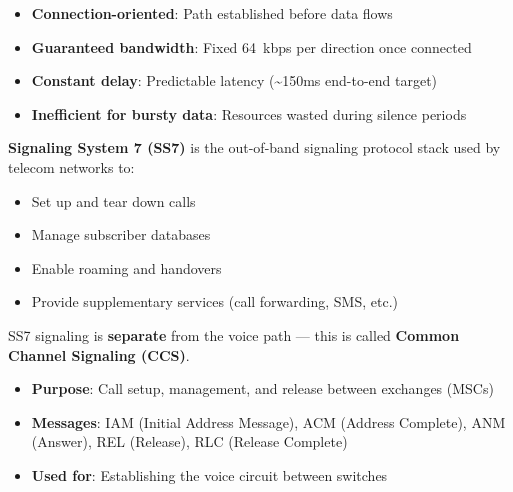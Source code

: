 
\begin{itemize}
\tightlist
\item
  \textbf{Connection-oriented}: Path established before data flows
\item
  \textbf{Guaranteed bandwidth}: Fixed 64~kbps per direction once connected
\item
  \textbf{Constant delay}: Predictable latency (\textasciitilde{}150ms end-to-end target)
\item
  \textbf{Inefficient for bursty data}: Resources wasted during silence periods
\end{itemize}



\CNchained{}

\textbf{Signaling System 7 (SS7)} is the out-of-band signaling protocol stack used by telecom networks to:

\begin{itemize}
\tightlist
\item
  Set up and tear down calls
\item
  Manage subscriber databases
\item
  Enable roaming and handovers
\item
  Provide supplementary services (call forwarding, SMS, etc.)
\end{itemize}

SS7 signaling is \textbf{separate} from the voice path — this is called \textbf{Common Channel Signaling (CCS)}.






\CNchained{}

\begin{itemize}
\tightlist
\item
  \textbf{Purpose}: Call setup, management, and release between exchanges (MSCs)
\item
  \textbf{Messages}: IAM (Initial Address Message), ACM (Address Complete), ANM (Answer), REL (Release), RLC (Release Complete)
\item
  \textbf{Used for}: Establishing the voice circuit between switches
\end{itemize}

